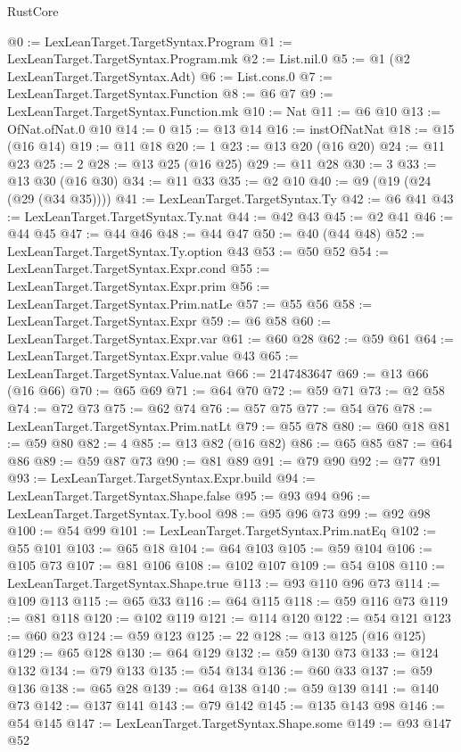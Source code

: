 \begin{lexlean}{RustCore}
\begin{coremodule}
@0 := LexLeanTarget.TargetSyntax.Program
@1 := LexLeanTarget.TargetSyntax.Program.mk
@2 := List.nil.{0}
@5 := @1 (@2 LexLeanTarget.TargetSyntax.Adt)
@6 := List.cons.{0}
@7 := LexLeanTarget.TargetSyntax.Function
@8 := @6 @7
@9 := LexLeanTarget.TargetSyntax.Function.mk
@10 := Nat
@11 := @6 @10
@13 := OfNat.ofNat.{0} @10
@14 := 0
@15 := @13 @14
@16 := instOfNatNat
@18 := @15 (@16 @14)
@19 := @11 @18
@20 := 1
@23 := @13 @20 (@16 @20)
@24 := @11 @23
@25 := 2
@28 := @13 @25 (@16 @25)
@29 := @11 @28
@30 := 3
@33 := @13 @30 (@16 @30)
@34 := @11 @33
@35 := @2 @10
@40 := @9 (@19 (@24 (@29 (@34 @35))))
@41 := LexLeanTarget.TargetSyntax.Ty
@42 := @6 @41
@43 := LexLeanTarget.TargetSyntax.Ty.nat
@44 := @42 @43
@45 := @2 @41
@46 := @44 @45
@47 := @44 @46
@48 := @44 @47
@50 := @40 (@44 @48)
@52 := LexLeanTarget.TargetSyntax.Ty.option @43
@53 := @50 @52
@54 := LexLeanTarget.TargetSyntax.Expr.cond
@55 := LexLeanTarget.TargetSyntax.Expr.prim
@56 := LexLeanTarget.TargetSyntax.Prim.natLe
@57 := @55 @56
@58 := LexLeanTarget.TargetSyntax.Expr
@59 := @6 @58
@60 := LexLeanTarget.TargetSyntax.Expr.var
@61 := @60 @28
@62 := @59 @61
@64 := LexLeanTarget.TargetSyntax.Expr.value @43
@65 := LexLeanTarget.TargetSyntax.Value.nat
@66 := 2147483647
@69 := @13 @66 (@16 @66)
@70 := @65 @69
@71 := @64 @70
@72 := @59 @71
@73 := @2 @58
@74 := @72 @73
@75 := @62 @74
@76 := @57 @75
@77 := @54 @76
@78 := LexLeanTarget.TargetSyntax.Prim.natLt
@79 := @55 @78
@80 := @60 @18
@81 := @59 @80
@82 := 4
@85 := @13 @82 (@16 @82)
@86 := @65 @85
@87 := @64 @86
@89 := @59 @87 @73
@90 := @81 @89
@91 := @79 @90
@92 := @77 @91
@93 := LexLeanTarget.TargetSyntax.Expr.build
@94 := LexLeanTarget.TargetSyntax.Shape.false
@95 := @93 @94
@96 := LexLeanTarget.TargetSyntax.Ty.bool
@98 := @95 @96 @73
@99 := @92 @98
@100 := @54 @99
@101 := LexLeanTarget.TargetSyntax.Prim.natEq
@102 := @55 @101
@103 := @65 @18
@104 := @64 @103
@105 := @59 @104
@106 := @105 @73
@107 := @81 @106
@108 := @102 @107
@109 := @54 @108
@110 := LexLeanTarget.TargetSyntax.Shape.true
@113 := @93 @110 @96 @73
@114 := @109 @113
@115 := @65 @33
@116 := @64 @115
@118 := @59 @116 @73
@119 := @81 @118
@120 := @102 @119
@121 := @114 @120
@122 := @54 @121
@123 := @60 @23
@124 := @59 @123
@125 := 22
@128 := @13 @125 (@16 @125)
@129 := @65 @128
@130 := @64 @129
@132 := @59 @130 @73
@133 := @124 @132
@134 := @79 @133
@135 := @54 @134
@136 := @60 @33
@137 := @59 @136
@138 := @65 @28
@139 := @64 @138
@140 := @59 @139
@141 := @140 @73
@142 := @137 @141
@143 := @79 @142
@145 := @135 @143 @98
@146 := @54 @145
@147 := LexLeanTarget.TargetSyntax.Shape.some
@149 := @93 @147 @52

\end{coremodule}
\end{lexlean}
